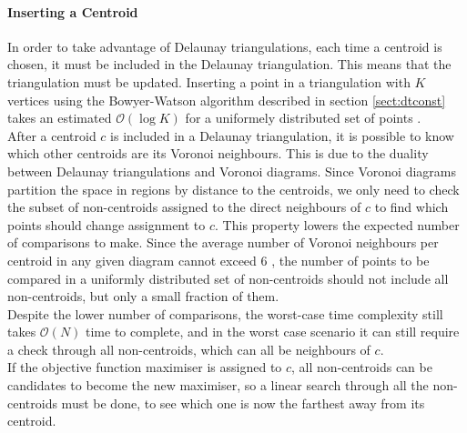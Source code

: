 \paragraph{Inserting a Centroid}
In order to take advantage of Delaunay triangulations, each time a centroid is chosen, it must be included in the Delaunay triangulation. This means that the triangulation must be updated. Inserting a point in a triangulation with $K$ vertices using the Bowyer-Watson algorithm described in section \ref{sect:dtconst} takes an estimated $\mathcal{O}(\log{K})$ for a uniformely distributed set of points \cite{tricomplex}.\\
After a centroid $c$ is included in a Delaunay triangulation, it is possible to know which other centroids are its Voronoi neighbours. This is due to the duality between Delaunay triangulations and Voronoi diagrams.
Since Voronoi diagrams partition the space in regions by distance to the centroids, we only need to check the subset of non-centroids assigned to the direct neighbours of $c$ to find which points should change assignment to $c$. 
This property lowers the expected number of comparisons to make. Since the average number of Voronoi neighbours per centroid in any given diagram cannot exceed 6 \cite{tricard2} \cite{tricard1}, the number of points to be compared in a uniformly distributed set of non-centroids should not include all non-centroids, but only a small fraction of them.\\
Despite the lower number of comparisons, the worst-case time complexity still takes $\mathcal{O}(N)$ time to complete, and in the worst case scenario it can still require a check through all non-centroids, which can all be neighbours of $c$.\\
If the objective function maximiser is assigned to $c$, all non-centroids can be candidates to become the new maximiser, so a linear search through all the non-centroids must be done, to see which one is now the farthest away from its centroid.

